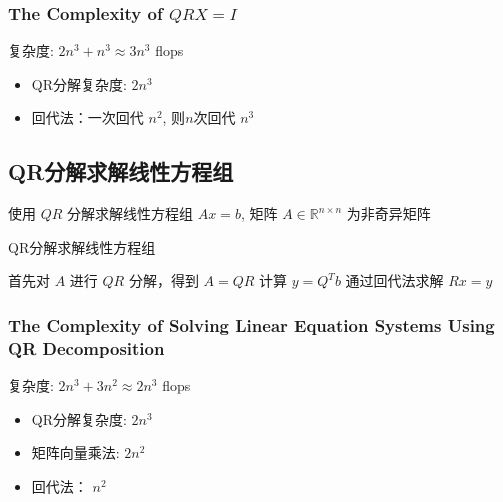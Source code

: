 \subsubsection{The Complexity of $ Q R X=I $}

复杂度: $ 2 n^{3}+n^{3} \approx 3 n^{3} $ flops

\begin{itemize}
    \item QR分解复杂度: $ 2 n^{3} $
    \item 回代法：一次回代 $ n^{2} $, 则$n$次回代 $ n^{3} $
\end{itemize}


\subsection{QR分解求解线性方程组}

使用 $ Q R $ 分解求解线性方程组 $ A x=b $, 矩阵 $ A \in \mathbb{R}^{n \times n} $ 为非奇异矩阵

\begin{algorithm}[htbp]
    \caption{QR分解求解线性方程组}
    首先对 $ A $ 进行 $ Q R $ 分解，得到 $ A=Q R $\;
    计算 $ y=Q^{T} b $\;
    通过回代法求解 $ R x=y $\;
\end{algorithm}


\subsubsection{The Complexity of Solving Linear Equation Systems Using QR Decomposition}

复杂度: $ 2 n^{3}+3 n^{2} \approx 2 n^{3} $ flops 

\begin{itemize}
    \item QR分解复杂度: $ 2 n^{3} $
    \item 矩阵向量乘法: $ 2 n^{2} $
    \item 回代法： $ n^{2} $
\end{itemize}
